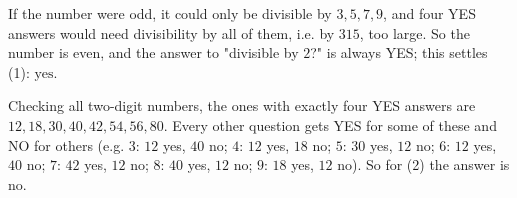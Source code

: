 If the number were odd, it could only be divisible by $3,5,7,9$, and four YES answers would need divisibility by all of them, i.e. by $315$, too large. So the number is even, and the answer to "divisible by $2$?" is always YES; this settles (1): $\boxed{\text{yes}}$.

Checking all two-digit numbers, the ones with exactly four YES answers are $12,18,30,40,42,54,56,80$. Every other question gets YES for some of these and NO for others (e.g. $3$: $12$ yes, $40$ no; $4$: $12$ yes, $18$ no; $5$: $30$ yes, $12$ no; $6$: $12$ yes, $40$ no; $7$: $42$ yes, $12$ no; $8$: $40$ yes, $12$ no; $9$: $18$ yes, $12$ no). So for (2) the answer is $\boxed{\text{no}}$.
